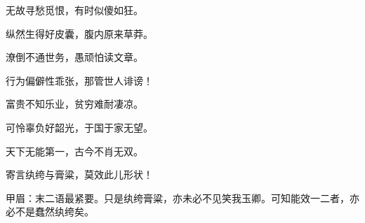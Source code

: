 \begin{poem}
    \begin{pl}无故寻愁觅恨，有时似傻如狂。\end{pl}
    \begin{pl}纵然生得好皮囊，腹内原来草莽。\end{pl}

    \begin{pl}潦倒不通世务，愚顽怕读文章。\end{pl}
    \begin{pl}行为偏僻性乖张，那管世人诽谤！\end{pl}

    \begin{pl}富贵不知乐业，贫穷难耐凄凉。\end{pl}
    \begin{pl}可怜辜负好韶光，于国于家无望。\end{pl}

    \begin{pl}天下无能第一，古今不肖无双。\end{pl}
    \begin{pl}寄言纨绔与膏粱，莫效此儿形状！\end{pl}
    \begin{note}甲眉：末二语最紧要。只是纨绔膏粱，亦未必不见笑我玉卿。可知能效一二者，亦必不是蠢然纨绔矣。\end{note}
\end{poem}


